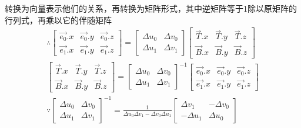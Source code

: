 转换为向量表示他们的关系，再转换为矩阵形式，其中逆矩阵等于1除以原矩阵的行列式，再乘以它的伴随矩阵
\begin{gather*}
    \therefore \begin{bmatrix}
        \overrightarrow{e_{0}}.x & \overrightarrow{e_{0}}.y & \overrightarrow{e_{0}}.z \\ 
        \overrightarrow{e_{1}}.x & \overrightarrow{e_{1}}.y & \overrightarrow{e_{1}}.z  
    \end{bmatrix} = \begin{bmatrix}
        \Delta u_{0} & \Delta v_{0} \\ 
        \Delta u_{1} & \Delta v_{1}
    \end{bmatrix} \begin{bmatrix}
        \overrightarrow{T}.x & \overrightarrow{T}.y & \overrightarrow{T}.z \\ 
        \overrightarrow{B}.x & \overrightarrow{B}.y & \overrightarrow{B}.z  
    \end{bmatrix} \\ 
    \begin{bmatrix}
        \overrightarrow{T}.x & \overrightarrow{T}.y & \overrightarrow{T}.z \\ 
        \overrightarrow{B}.x & \overrightarrow{B}.y & \overrightarrow{B}.z  
    \end{bmatrix} = \begin{bmatrix}
        \Delta u_{0} & \Delta v_{0} \\ 
        \Delta u_{1} & \Delta v_{1}
    \end{bmatrix}^{-1} \begin{bmatrix}
        \overrightarrow{e_{0}}.x & \overrightarrow{e_{0}}.y & \overrightarrow{e_{0}}.z \\ 
        \overrightarrow{e_{1}}.x & \overrightarrow{e_{1}}.y & \overrightarrow{e_{1}}.z  
    \end{bmatrix} \\ 
    \because  \begin{bmatrix}
        \Delta u_{0} & \Delta v_{0} \\ 
        \Delta u_{1} & \Delta v_{1}
    \end{bmatrix}^{-1} = \frac{1}{\Delta u_{0} \Delta v_{1} - \Delta v_{0} \Delta u_{1}} \begin{bmatrix}
        \Delta v_{1} & -\Delta v_{0} \\ 
        -\Delta u_{1} & \Delta u_{0}
    \end{bmatrix} \\ 

\end{gather*}
